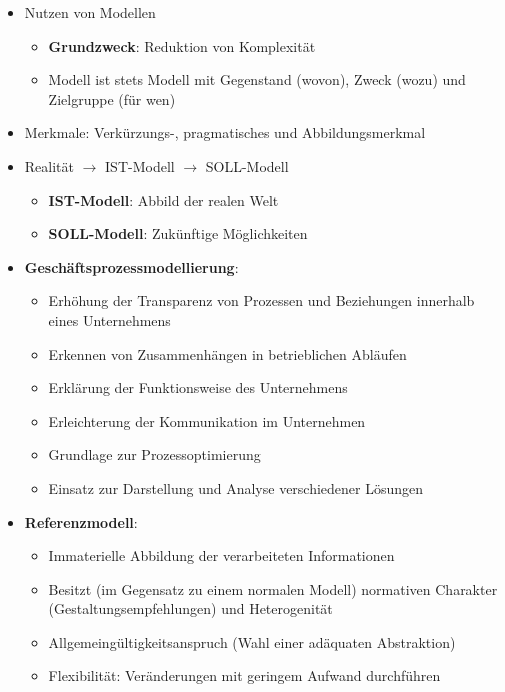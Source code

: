 \documentclass[12pt,a4paper]{article}
\begin{document}
\begin{itemize}
   \item Nutzen von Modellen
      \begin{itemize}
         \item \textbf{Grundzweck}: Reduktion von Komplexität
         \item Modell ist stets Modell mit Gegenstand (wovon), Zweck (wozu) und Zielgruppe (für wen)
      \end{itemize}
      
   \item Merkmale: Verkürzungs-, pragmatisches und Abbildungsmerkmal
   
   \item Realität $\rightarrow$ IST-Modell $\rightarrow$ SOLL-Modell
      \begin{itemize}
         \item \textbf{IST-Modell}:  Abbild der realen Welt
         \item \textbf{SOLL-Modell}: Zukünftige Möglichkeiten
      \end{itemize}

   \item \textbf{Geschäftsprozessmodellierung}:
      \begin{itemize}
         \item Erhöhung der Transparenz von Prozessen und Beziehungen innerhalb eines Unternehmens
         \item Erkennen von Zusammenhängen in betrieblichen Abläufen
         \item Erklärung der Funktionsweise des Unternehmens
         \item Erleichterung der Kommunikation im Unternehmen
         \item Grundlage zur Prozessoptimierung
         \item Einsatz zur Darstellung und Analyse verschiedener Lösungen
      \end{itemize}

   \item \textbf{Referenzmodell}:
      \begin{itemize}
         \item Immaterielle Abbildung der verarbeiteten Informationen
         \item Besitzt (im Gegensatz zu einem normalen Modell) normativen Charakter (Gestaltungsempfehlungen) und Heterogenität
         \item Allgemeingültigkeitsanspruch (Wahl einer adäquaten Abstraktion)
         \item Flexibilität: Veränderungen mit geringem Aufwand durchführen
      \end{itemize}
\end{itemize}
\end{document}
